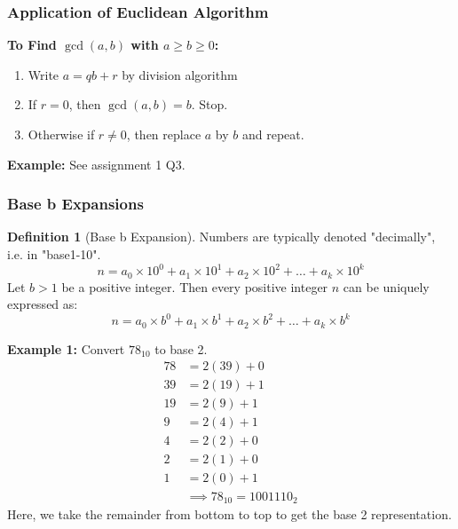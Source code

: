 \documentclass[12pt]{article}
\theoremstyle{definition}
\newtheorem{definition}{Definition}
\begin{document}
    \subsubsection{Application of Euclidean Algorithm}
    \textbf{To Find $\gcd(a,b)$ with $a \ge b \ge 0$:}
    \begin{enumerate}
        \item Write $a = qb + r$ by division algorithm
        \item If $r = 0$, then $\gcd(a,b) = b$. Stop.
        \item Otherwise if $r \ne 0$, then replace $a$ by $b$ and repeat.
    \end{enumerate}

    \textbf{Example:} See assignment 1 Q3.

    \subsubsection{Base b Expansions}
    \begin{definition}[Base b Expansion]
        \label{def:base-b-expansion}
        Numbers are typically denoted "decimally", i.e. in "base1-10".
        \begin{equation*}
            n = a_0 \times 10^0 + a_1 \times 10^1 + a_2 \times 10^2 + \dots + a_k \times 10^k
        \end{equation*}
        Let $b > 1$ be a positive integer. Then every positive integer $n$ can be
        uniquely expressed as:
        \begin{equation*}
            n = a_0 \times b^0 + a_1 \times b^1 + a_2 \times b^2 + \dots + a_k \times b^k
        \end{equation*} 
    \end{definition}

    \textbf{Example 1:} Convert $78_{10}$ to base 2.
    \begin{align*}
        78 &= 2(39) + 0 \\
        39 &= 2(19) + 1 \\
        19 &= 2(9) + 1 \\
        9 &= 2(4) + 1 \\
        4 &= 2(2) + 0 \\
        2 &= 2(1) + 0 \\
        1 &= 2(0) + 1 \\
        &\implies 78_{10} = 1001110_2
    \end{align*}
    Here, we take the remainder from bottom to top to get the base 2 representation.
\end{document}
